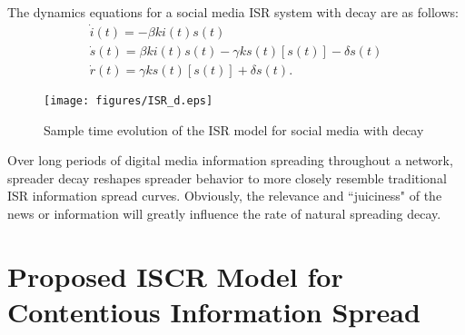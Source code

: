 \noindent The dynamics equations for a social media ISR system with decay are as follows:
\begin{equation}\label{eqn:ISR_dynamics_decay}
\left.\begin{aligned}
\dot{i}(t) = -\beta k i(t)s(t)\\
\dot{s}(t) = \beta k i(t)s(t) - \gamma k s(t)[s(t)]-\delta s(t)\\
\dot{r}(t) = \gamma k s(t)[s(t)]+ \delta s(t).
\end{aligned}\right.
\end{equation}

\begin{figure}[!htbp] \centering
  \texttt{[image: figures/ISR\_d.eps]}
  \caption{Sample time evolution of the ISR model for social media with decay}
  \label{fig:ISR_d}
  \end{figure}

\noindent Over long periods of digital media information spreading throughout a network, spreader decay reshapes spreader behavior to more closely resemble traditional ISR information spread curves. Obviously, the relevance and ``juiciness" of the news or information will greatly influence the rate of natural spreading decay.

\section{Proposed ISCR Model for Contentious Information Spread} 


